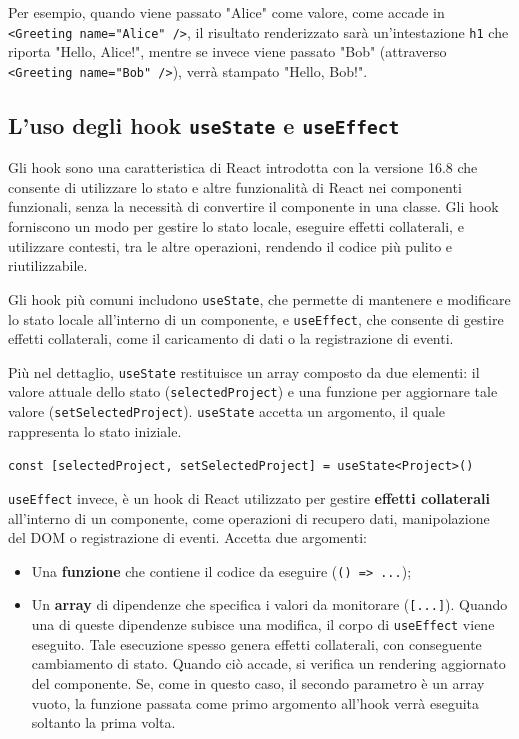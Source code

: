 \documentclass[target=bach,aauheader=,style=]{thud}
\begin{document}
\noindent Per esempio, quando viene passato "Alice" come valore, come accade in \texttt{<Greeting name="Alice" />}, il risultato renderizzato sarà un'intestazione \texttt{h1} che riporta "Hello, Alice!", mentre se invece viene passato "Bob" (attraverso \texttt{<Greeting name="Bob" />}), verrà stampato "Hello, Bob!".

\subsection{L'uso degli hook \texttt{useState} e \texttt{useEffect}}
Gli hook sono una caratteristica di React introdotta con la versione 16.8 che consente di utilizzare lo stato e altre funzionalità di React nei componenti funzionali, senza la necessità di convertire il componente in una classe. Gli hook forniscono un modo per gestire lo stato locale, eseguire effetti collaterali, e utilizzare contesti, tra le altre operazioni, rendendo il codice più pulito e riutilizzabile. 

\noindent Gli hook più comuni includono \texttt{useState}, che permette di mantenere e modificare lo stato locale all'interno di un componente, e \texttt{useEffect}, che consente di gestire effetti collaterali, come il caricamento di dati o la registrazione di eventi. 

\noindent Più nel dettaglio, \texttt{useState} restituisce un array composto da due elementi: il valore attuale dello stato (\texttt{selectedProject}) e una funzione per aggiornare tale valore (\texttt{setSelectedProject}). \texttt{useState} accetta un argomento, il quale rappresenta lo stato iniziale.

\begin{center}
\texttt{const [selectedProject, setSelectedProject] = useState<Project>({})}
\end{center}

\noindent \texttt{useEffect} invece, è un hook di React utilizzato per gestire \textbf{effetti collaterali} all'interno di un componente, come operazioni di recupero dati, manipolazione del DOM o registrazione di eventi. Accetta due argomenti: 

\begin{itemize}
    \item Una \textbf{funzione} che contiene il codice da eseguire (\texttt{() => {...}});
    \item Un \textbf{array} di dipendenze che specifica i valori da monitorare (\texttt{[...]}). Quando una di queste dipendenze subisce una modifica, il corpo di \texttt{useEffect} viene eseguito. Tale esecuzione spesso genera effetti collaterali, con conseguente cambiamento di stato. Quando ciò accade, si verifica un rendering aggiornato del componente. Se, come in questo caso, il secondo parametro è un array vuoto, la funzione passata come primo argomento all'hook verrà eseguita soltanto la prima volta.
\end{itemize}
\end{document}
